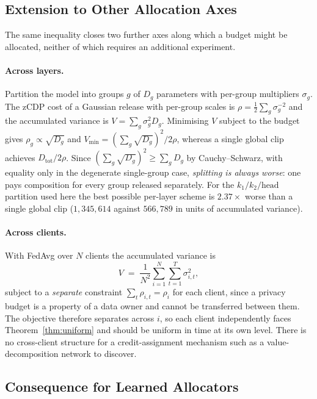 \subsection{Extension to Other Allocation Axes}

The same inequality closes two further axes along which a budget might be
allocated, neither of which requires an additional experiment.

\paragraph{Across layers.}
Partition the model into groups $g$ of $D_g$ parameters with per-group
multipliers $\sigma_g$. The zCDP cost of a Gaussian release with per-group
scales is $\rho=\tfrac12\sum_g \sigma_g^{-2}$ and the accumulated variance is
$V=\sum_g \sigma_g^{2}D_g$. Minimising $V$ subject to the budget gives
$\rho_g \propto \sqrt{D_g}$ and $V_{\min} = \left(\sum_g\sqrt{D_g}\right)^{2}/2\rho$,
whereas a single global clip achieves $D_{\text{tot}}/2\rho$. Since
$\left(\sum_g \sqrt{D_g}\right)^{2}\ge \sum_g D_g$ by Cauchy--Schwarz, with
equality only in the degenerate single-group case, \emph{splitting is always
worse}: one pays composition for every group released separately. For the
$k_1/k_2/\text{head}$ partition used here the best possible per-layer scheme is
$2.37\times$ worse than a single global clip ($1{,}345{,}614$ against
$566{,}789$ in units of accumulated variance).

\paragraph{Across clients.}
With FedAvg over $N$ clients the accumulated variance is
\begin{equation}
  V \;=\; \frac{1}{N^{2}}\sum_{i=1}^{N}\sum_{t=1}^{T} \sigma_{i,t}^{2},
  \label{eq:clients}
\end{equation}
subject to a \emph{separate} constraint $\sum_t\rho_{i,t}=\rho_i$ for each
client, since a privacy budget is a property of a data owner and cannot be
transferred between them. The objective therefore separates across $i$, so each
client independently faces Theorem~\ref{thm:uniform} and should be uniform in
time at its own level. There is no cross-client structure for a
credit-assignment mechanism such as a value-decomposition network to discover.

\subsection{Consequence for Learned Allocators}
\label{sec:consequence}

